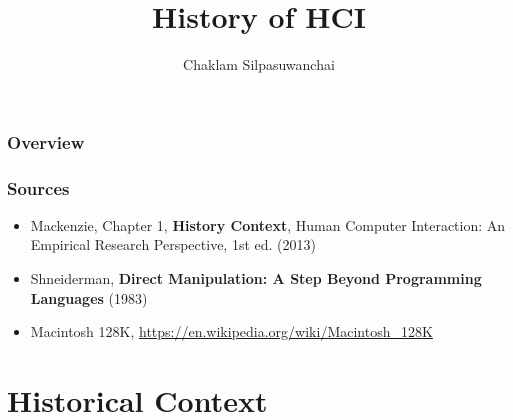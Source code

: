 \documentclass{beamer}
\title[History of HCI]{History of HCI} %
\author{Chaklam Silpasuwanchai} %
\institute[AIT] %
{
Asian Institute of Technology \\ %
\medskip
\textit{chaklam@ait.asia} %
}
\date{} %
\begin{document}
\begin{frame}
\titlepage %
\end{frame}


\begin{frame}
\frametitle{Overview} %
\tableofcontents %
\end{frame}


\begin{frame}
\frametitle{Sources} 
\begin{itemize}
		\item Mackenzie, Chapter 1, \textbf{History Context}, Human Computer Interaction: An Empirical Research Perspective, 1st ed. (2013) 
		\item Shneiderman, \textbf{Direct Manipulation: A Step Beyond Programming Languages} (1983)
		\item Macintosh 128K, \url{https://en.wikipedia.org/wiki/Macintosh_128K}
\end{itemize}
\end{frame}


\section{Historical Context} %
\end{document}
